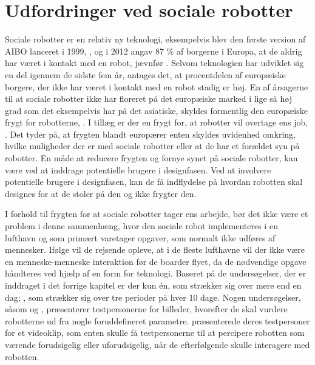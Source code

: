 \section{Udfordringer ved sociale robotter}
\label{UdfordringerSocialeRobotter}
%
Sociale robotter er en relativ ny teknologi, eksempelvis blev den første version af AIBO lanceret i 1999, \textcite{WEB:AIBO}, og i 2012 angav 87 \% af borgerne i Europa, at de aldrig har været i kontakt med en robot, jævnfør . Selvom teknologien har udviklet sig en del igennem de sidste fem år, antages det, at procentdelen af europæiske borgere, der ikke har været i kontakt med en robot stadig er høj. En af årsagerne til at sociale robotter ikke har floreret på det europæiske marked i lige så høj grad som det eksempelvis har på det asiatiske, skyldes formentlig den europæiske frygt for robotterne, \parencite[s. 28]{PDF:InTheCompanyofRobots}. I tillæg er der en frygt for, at robotter vil overtage ens job, \parencite[s. 42]{PDF:PerceptionAcceptance}. Det tyder på, at frygten blandt europærer enten skyldes uvidenhed omkring, hvilke muligheder der er med sociale robotter eller at de har et forældet syn på robotter. En måde at reducere frygten og fornye synet på sociale robotter, kan være ved at inddrage potentielle brugere i designfasen. Ved at involvere potentielle brugere i designfasen, kan de få indflydelse på hvordan robotten skal designes for at de stoler på den og ikke frygter den.      

I forhold til frygten for at sociale robotter tager ens arbejde, bør det ikke være et problem i denne sammenhæng, hvor den sociale robot implementeres i en lufthavn og som primært varetager opgaver, som normalt ikke udføres af mennesker. Ifølge \textcite[s. 352]{PDF:TheImpactOfTraveler} vil de rejsende opleve, at i de fleste lufthavne vil der ikke være en menneske-menneske interaktion før de boarder flyet, da de nødvendige opgave håndteres ved hjælp af en form for teknologi. \blankline
%
Baseret på de undersøgelser, der er inddraget i det forrige kapitel er der kun én, som strækker sig over mere end en dag; \textcite[s. 3]{PDF:SharingALifeHarvey}, som strækker sig over tre perioder på hver 10 dage. Nogen undersøgelser, såsom \textcite[s. 273]{PDF:PerceptionAcceptance} og \textcite[s. 23]{PDF:CloseButNotStuck}, præsenterer testpersonerne for billeder, hvorefter de skal vurdere robotterne ud fra nogle foruddefineret parametre. \textcite[s. 62]{PDF:PerceptionAcceptance} præsenterede deres testpersoner for et videoklip, som enten skulle få testpersonerne til at percipere robotten som værende forudsigelig eller uforudsigelig, når de efterfølgende skulle interagere med robotten. 


